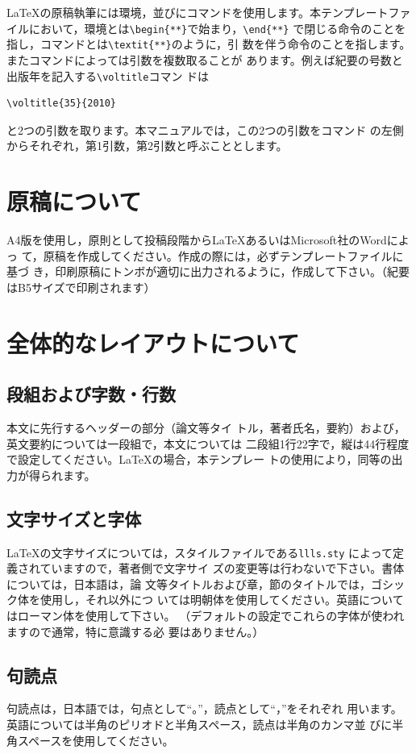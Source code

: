 \documentclass[b5paper,10pt,twocolumn,tombow]{jarticle}
\begin{document}
\LaTeX{}の原稿執筆には環境，並びにコマンドを使用します。本テンプレートファ
イルにおいて，環境とは\verb|\begin{**}|で始まり，\verb|\end{**}|
で閉じる命令のことを指し，コマンドとは\verb|\textit{**}|のように，引
数を伴う命令のことを指します。またコマンドによっては引数を複数取ることが
あります。例えば紀要の号数と出版年を記入する\verb|\voltitle|コマン
ドは
\begin{verbatim}
\voltitle{35}{2010}
\end{verbatim}
と2つの引数を取ります。本マニュアルでは，この2つの引数をコマンド
の左側からそれぞれ，第1引数，第2引数と呼ぶこととします。

\section{原稿について}
A4版を使用し，原則として投稿段階から\LaTeX{}あるいはMicrosoft社のWordによっ
て，原稿を作成してください。作成の際には，必ずテンプレートファイルに基づ
き，印刷原稿にトンボが適切に出力されるように，作成して下さい。（紀要
はB5サイズで印刷されます）

\section{全体的なレイアウトについて}
\subsection{段組および字数・行数}

本文に先行するヘッダーの部分（論文等タイ
トル，著者氏名，要約）および，英文要約については一段組で，本文については
二段組1行22字で，縦は44行程度で設定してください。\LaTeX{}の場合，本テンプレー
トの使用により，同等の出力が得られます。


\subsection{文字サイズと字体}
\LaTeX{}の文字サイズについては，スタイルファイルである\texttt{llls.sty}
によって定義されていますので，著者側で文字サイ
ズの変更等は行わないで下さい。書体については，日本語は，論
文等タイトルおよび章，節のタイトルでは，ゴシック体を使用し，それ以外につ
いては明朝体を使用してください。英語についてはローマン体を使用して下さい。
（デフォルトの設定でこれらの字体が使われますので通常，特に意識する必
要はありません。）

\subsection{句読点}
句読点は，日本語では，句点として``。''，読点として``，''をそれぞれ
用います。英語については半角のピリオドと半角スペース，読点は半角のカンマ並
びに半角スペースを使用してください。
\end{document}
